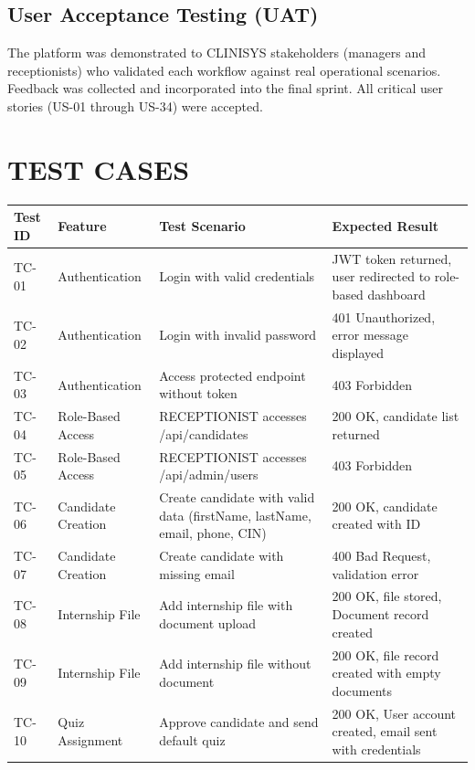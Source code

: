 \subsection{User Acceptance Testing (UAT)}
The platform was demonstrated to CLINISYS stakeholders (managers and receptionists) who validated each workflow against real operational scenarios. Feedback was collected and incorporated into the final sprint. All critical user stories (US-01 through US-34) were accepted.

\section{TEST CASES}

\begin{table}[H]
\centering
\small
\begin{tabular}{|p{1.5cm}|p{3.5cm}|p{3.5cm}|p{5cm}|}
\hline
\rowcolor{gray!20}
\textbf{Test ID} & \textbf{Feature} & \textbf{Test Scenario} & \textbf{Expected Result} \\
\hline
TC-01 & Authentication & Login with valid credentials & JWT token returned, user redirected to role-based dashboard \\
\hline
TC-02 & Authentication & Login with invalid password & 401 Unauthorized, error message displayed \\
\hline
TC-03 & Authentication & Access protected endpoint without token & 403 Forbidden \\
\hline
TC-04 & Role-Based Access & RECEPTIONIST accesses /api/candidates & 200 OK, candidate list returned \\
\hline
TC-05 & Role-Based Access & RECEPTIONIST accesses /api/admin/users & 403 Forbidden \\
\hline
TC-06 & Candidate Creation & Create candidate with valid data (firstName, lastName, email, phone, CIN) & 200 OK, candidate created with ID \\
\hline
TC-07 & Candidate Creation & Create candidate with missing email & 400 Bad Request, validation error \\
\hline
TC-08 & Internship File & Add internship file with document upload & 200 OK, file stored, Document record created \\
\hline
TC-09 & Internship File & Add internship file without document & 200 OK, file record created with empty documents \\
\hline
TC-10 & Quiz Assignment & Approve candidate and send default quiz & 200 OK, User account created, email sent with credentials \\

\end{tabular}
\end{table}

